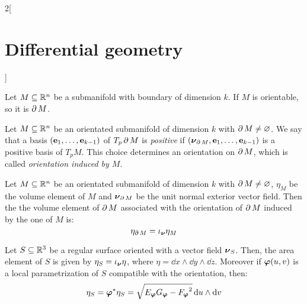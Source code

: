 \documentclass[../../../main.tex]{subfiles}
\begin{document}
\begin{multicols}{2}[\section{Differential geometry}]
\begin{definition}
  \end{definition}
  \begin{proposition}
    Let $M\subseteq\mathbb{R}^n$ be a submanifold with boundary of dimension $k$. If $M$ is orientable, so it is $\operatorname{\partial}{M}$.
  \end{proposition}
  \begin{definition}
    Let $M\subseteq\mathbb{R}^n$ be an orientated submanifold of dimension $k$ with $\operatorname{\partial}{M}\ne\varnothing$. We say that a basis $(\boldsymbol{\mathrm{e}}_1,\ldots,\boldsymbol{\mathrm{e}}_{k-1})$ of $T_p\operatorname{\partial}{M}$ is \emph{positive} if $(\boldsymbol{\mathrm{\nu}}_{\operatorname{\partial}{M}},\boldsymbol{\mathrm{e}}_1,\ldots,\boldsymbol{\mathrm{e}}_{k-1})$ is a positive basis of $T_pM$. This choice determines an orientation on $\operatorname{\partial}{M}$, which is called \emph{orientation induced by $M$}.
  \end{definition}
  \begin{proposition}
    Let $M\subseteq\mathbb{R}^n$ be an orientated submanifold of dimension $k$ with $\operatorname{\partial}{M}\ne\varnothing$, $\eta_M$ be the volume element of $M$ and $\boldsymbol{\mathrm{\nu}}_{\operatorname{\partial}{M}}$ be the unit normal exterior vector field. Then the the volume element of $\operatorname{\partial}{M}$ associated with the orientation of $\operatorname{\partial}{M}$ induced by the one of $M$ is: $$\eta_{\operatorname{\partial}{M}}=\iota_{\boldsymbol{\mathrm{\nu}}}\eta_M$$
  \end{proposition}
  \begin{proposition}
    Let $S\subseteq\mathbb{R}^3$ be a regular surface oriented with a vector field $\boldsymbol{\mathrm{\nu}}_S$. Then, the area element of $S$ is given by $\eta_S=\iota_{\boldsymbol{\mathrm{\nu}}}\eta$, where $\eta=\dd{x}\wedge\dd{y}\wedge\dd{z}$. Moreover if $\boldsymbol{\mathrm{\varphi}}(u,v)$ is a local parametrization of $S$ compatible with the orientation, then: $$\eta_S=\boldsymbol{\mathrm{\varphi}}^*\eta_S=\sqrt{E_{\boldsymbol{\mathrm{\varphi}}}G_{\boldsymbol{\mathrm{\varphi}}}-{F_{\boldsymbol{\mathrm{\varphi}}}}^2}\dd{u}\wedge\dd{v}$$
  \end{proposition}

\end{multicols}
\end{document}

